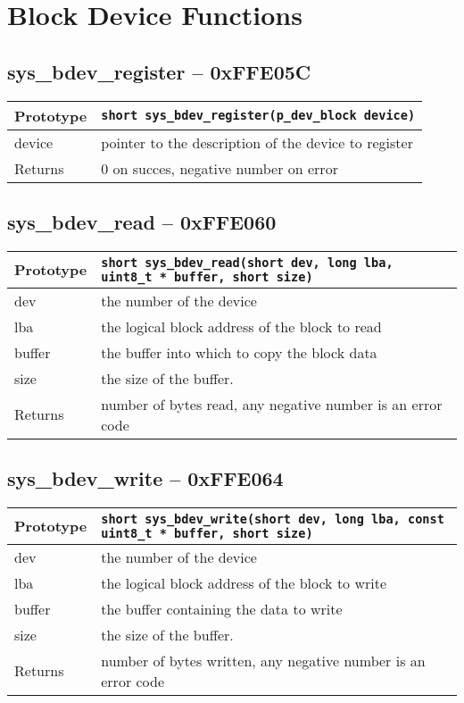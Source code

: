\section{Block Device Functions}

\subsection*{sys\_bdev\_register -- 0xFFE05C}
\begin{tabular}{|l||l|} \hline
Prototype & \lstinline!short sys_bdev_register(p_dev_block device)! \\ \hline
device & pointer to the description of the device to register \\ \hline
Returns & 0 on succes, negative number on error \\ \hline
\end{tabular}

\subsection*{sys\_bdev\_read -- 0xFFE060}
\begin{tabular}{|l||l|} \hline
Prototype & \lstinline!short sys_bdev_read(short dev, long lba, uint8_t * buffer, short size)! \\ \hline
dev & the number of the device \\ \hline
lba & the logical block address of the block to read \\ \hline
buffer & the buffer into which to copy the block data \\ \hline
size & the size of the buffer. \\ \hline
Returns & number of bytes read, any negative number is an error code \\ \hline
\end{tabular}

\subsection*{sys\_bdev\_write -- 0xFFE064}
\begin{tabular}{|l||l|} \hline
Prototype & \lstinline!short sys_bdev_write(short dev, long lba, const uint8_t * buffer, short size)! \\ \hline
dev & the number of the device \\ \hline
lba & the logical block address of the block to write \\ \hline
buffer & the buffer containing the data to write \\ \hline
size & the size of the buffer. \\ \hline
Returns & number of bytes written, any negative number is an error code \\ \hline
\end{tabular}


